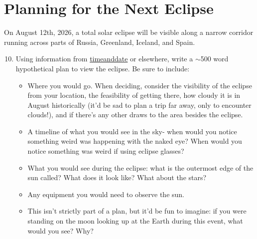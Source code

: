 \documentclass[12pt]{article}
\begin{document}

\section{Planning for the Next Eclipse}
On August 12th, 2026, a total solar eclipse will be visible along a narrow corridor running across parts of Russia, Greenland, Iceland, and Spain. 

\begin{enumerate} 
\setcounter{enumi}{9}
    \item Using information from \href{https://www.timeanddate.com/eclipse/solar/2026-august-12}{timeanddate} or elsewhere, write a $\sim$500 word hypothetical plan to view the eclipse. Be sure to include:
\begin{itemize}[leftmargin=*]
    \item Where you would go. When deciding, consider the visibility of the eclipse from your location, the feasibility of getting there, how cloudy it is in August historically (it'd be sad to plan a trip far away, only to encounter clouds!), and if there's any other draws to the area besides the eclipse.
    \item A timeline of what you would see in the sky- when would you notice something weird was happening with the naked eye? When would you notice something was weird if using eclipse glasses?    
    \item What you would see during the eclipse: what is the outermost edge of the sun called? What does it look like? What about the stars?
    \item Any equipment you would need to observe the sun.
    \item This isn't strictly part of a plan, but it'd be fun to imagine: if you were standing on the moon looking up at the Earth during this event, what would you see? Why?
\end{itemize}
\end{enumerate}
\end{document}

